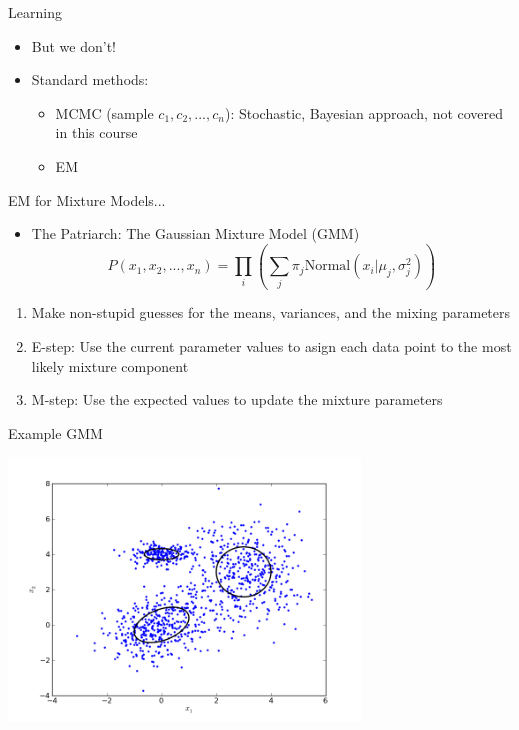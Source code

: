 \documentclass[aspectratio=169]{beamer}
\begin{document}
\begin{frame}{Learning}

\begin{itemize}
	\item But we don't!
	\item Standard methods:
	\begin{itemize}
	\item MCMC (sample $c_1, c_2, ..., c_n$): Stochastic, Bayesian approach, not covered in this course
	\item EM
	\end{itemize}
\end{itemize}

\end{frame}
\begin{frame}{EM for Mixture Models...}

\begin{itemize}
\item The Patriarch: The Gaussian Mixture Model (GMM)
$$P(x_1, x_2, ..., x_n) = \prod_i \left( \sum_j \pi_j \textrm{Normal} (x_i | \mu_j, \sigma^2_j) \right)$$
\end{itemize}
\begin{enumerate}
\item Make non-stupid guesses for the means, variances, and the mixing parameters
\item E-step: Use the current parameter values to asign each data point to the most likely  mixture component
\item M-step: Use the expected values to update the mixture parameters
\end{enumerate}
\end{frame}
\begin{frame}{Example GMM}

\includegraphics[width=0.7\textwidth]{lectMM/sample_gmm.png}
\end{frame}
\end{document}
